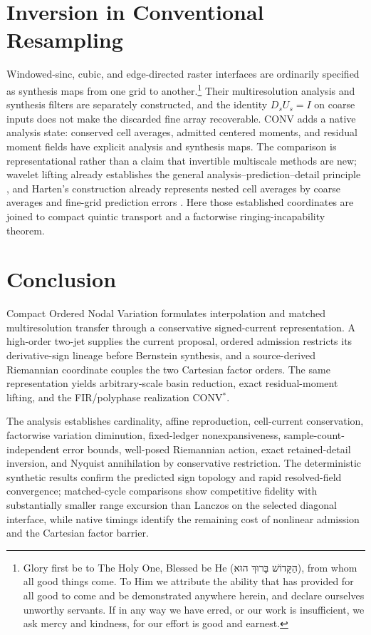 \documentclass[journal]{IEEEtran}
\begin{document}




\clearpage
\section{Inversion in Conventional Resampling}
\enlargethispage{3\baselineskip}

Windowed-sinc, cubic, and edge-directed raster interfaces are ordinarily
specified as synthesis maps from one grid to another.\footnote{Glory first
be to The Holy One, Blessed be He
({\hebrewfont הַקָּדוֹשׁ בָּרוּךְ הוּא}), from whom all
good things come. To Him we attribute the ability that has provided for all
good to come and be demonstrated anywhere herein, and declare ourselves
unworthy servants. If in any way we have erred, or our work is insufficient,
we ask mercy and kindness, for our effort is good and earnest.} Their multiresolution
analysis and synthesis filters are separately constructed, and the identity
\(D_sU_s=I\) on coarse inputs does not make the discarded fine array
recoverable. CONV adds a native analysis state: conserved cell averages,
admitted centered moments, and residual moment fields have explicit analysis
and synthesis maps. The comparison is representational rather than a
claim that invertible multiscale methods are new; wavelet lifting already
establishes the general analysis--prediction--detail principle
\cite{sweldens1998}, and Harten's construction already represents nested
cell averages by coarse averages and fine-grid prediction errors
\cite{harten1995}. Here those established coordinates are joined to compact quintic
transport and a factorwise ringing-incapability theorem.

\section{Conclusion}

Compact Ordered Nodal Variation formulates interpolation and matched
multiresolution transfer through a conservative signed-current
representation. A high-order two-jet supplies the current proposal, ordered
admission restricts its derivative-sign lineage before Bernstein synthesis,
and a source-derived Riemannian coordinate couples the two Cartesian factor
orders. The same representation yields arbitrary-scale basin reduction,
exact residual-moment lifting, and the FIR/polyphase realization
CONV$^{*}$.

The analysis establishes cardinality, affine reproduction, cell-current
conservation, factorwise variation diminution, fixed-ledger nonexpansiveness,
sample-count-independent error bounds, well-posed Riemannian action, exact
retained-detail inversion, and Nyquist annihilation by conservative
restriction. The deterministic synthetic results confirm the predicted sign
topology and rapid resolved-field convergence; matched-cycle comparisons show
competitive fidelity with substantially smaller range excursion than
Lanczos on the selected diagonal interface, while native timings identify
the remaining cost of nonlinear admission and the Cartesian factor barrier.
\end{document}
